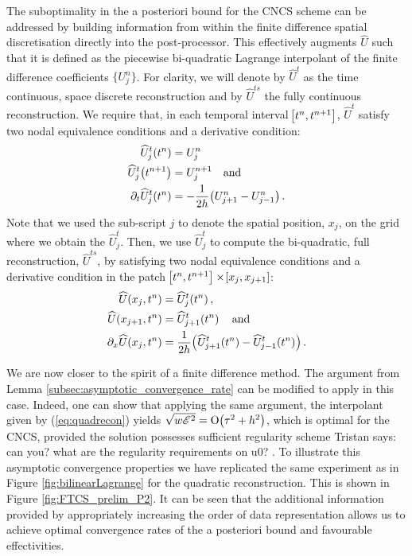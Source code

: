 \documentclass[final]{amsart}
\newcommand{\tristan}[1]{{\color{purple} Tristan says:  #1 }}
\numberwithin{equation}{section}
\begin{document}
The suboptimality in the a posteriori bound for the CNCS scheme can be
addressed by building information from within the finite difference
spatial discretisation directly into the post-processor.  This
effectively augments $\widehat U$ such that it is defined as the
piecewise bi-quadratic Lagrange interpolant of the finite difference
coefficients $\{U^n_j\}$.  For clarity, we will denote by $\widehat{
  U}^t$ as the time continuous, space discrete reconstruction and by
$\widehat{ U}^{ts}$ the fully continuous reconstruction.  We require
that, in each temporal interval $\!\left[{t^n, t^{n+1}}\right]$, $\widehat{ U}^t$
satisfy two nodal equivalence conditions and a derivative condition:
\begin{equation}
  \label{eq:quadrecon}
\begin{split}
\widehat{U}_j^t\!\left({t^n}\right) &= U_j^n
\\
\widehat{U}_j^t\!\left({t^{n+1}}\right) &= U_j^{n+1}\quad \text{and}
\\
\partial_t\widehat{U}_j^t\!\left({t^n}\right) &= -\frac{1}{2h}\!\left({U_{j+1}^{n}-U_{j-1}^{n}}\right).
\end{split}
\end{equation}
Note that we used the sub-script $j$ to denote the spatial position, $x_j$, on the grid where we obtain the $\widehat{U}^t_j$.  Then, we use  $\widehat{U}^t_j$ to compute the bi-quadratic, full reconstruction,  $\widehat{ U}^{ts}$, by satisfying two nodal equivalence conditions and a derivative condition  in the patch $\!\left[{t^n,t^{n+1}}\right]\times\!\left[{x_j,x_{j+1}}\right]$:
\begin{equation}
 \begin{split}
\widehat U(x_j,t^n) &= \widehat{U}_j^t\!\left({t^n}\right) ,
\\
\widehat U(x_{j+1},t^n) &= \widehat{U}_{j+1}^t\!\left({t^n}\right) \quad \text{and}
\\
\partial_x \widehat U(x_j, t^n) &= \frac 1 {2h} \!\left({\widehat{U}_{j+1}^t\!\left({t^n}\right) -\widehat{U}_{j-1}^t\!\left({t^n}\right) }\right).
\end{split}
\end{equation}

We are now closer to the spirit of a finite difference method. The
argument from Lemma \ref{subsec:asymptotic_convergence_rate} can be
modified to apply in this case. Indeed, one can show that applying the
same argument, the interpolant given by (\ref{eq:quadrecon}) yields
$\sqrt{w\mathscr E^2} = \operatorname{O}\!\left({\tau^2+h^2}\right)$, which is optimal for the CNCS, provided the solution possesses sufficient regularity
scheme \tristan{can you? what are the regularity requirements on
  u0?}. To illustrate this asymptotic convergence properties we have
replicated the same experiment as in Figure \ref{fig:bilinearLagrange}
for the quadratic reconstruction. This is shown in Figure
\ref{fig:FTCS_prelim_P2}.  It can be seen that the additional
information provided by appropriately increasing the order of data
representation allows us to achieve optimal convergence rates of the a
posteriori bound and favourable effectivities.
\end{document}
